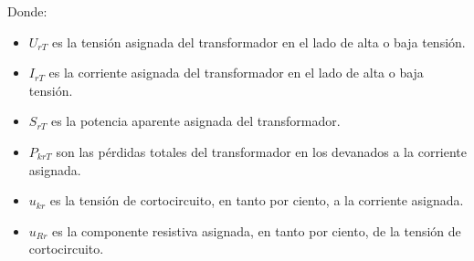 \begin{itemize}
                \newpage
                Donde:
                \begin{itemize}
                    \item $U_\textit{rT}$ es la tensión asignada del transformador en el lado de alta o baja tensión.
                    \item $I_\textit{rT}$ es la corriente asignada del transformador en el lado de alta o baja tensión.
                    \item $S_\textit{rT}$ es la potencia aparente asignada del transformador.
                    \item $P_\textit{krT}$ son las pérdidas totales del transformador en los devanados a la corriente asignada.
                    \item $u_\textit{kr}$ es la tensión de cortocircuito, en tanto por ciento, a la corriente asignada.
                    \item $u_\textit{Rr}$ es la componente resistiva asignada, en tanto por ciento, de la tensión de cortocircuito.
                \end{itemize}
            

\end{itemize}

